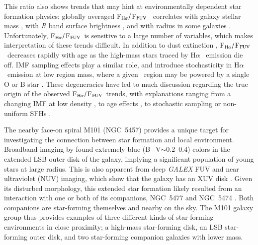 \documentclass[iop]{emulateapj}
\newcommand{\ha}{H$\alpha$}
\newcommand{\bmv}{B$-$V}
\newcommand{\hafuv}{F$_{\rm H\alpha}/$F$_{\rm FUV}$}
\begin{document}
This ratio also shows trends that may hint at environmentally
dependent star formation physics: globally averaged \hafuv
\ correlates with galaxy stellar mass \citep{boselli09, lee09}, with
\emph{R} band surface brightness \citep[but see Weisz et
  al. 2012]{meurer09}, and with radius in some galaxies
\citep{thilker05, goddard10, hunter10}.  Unfortunately, \hafuv \ is
sensitive to a large number of variables, which makes interpretation
of these trends difficult.  In addition to dust extinction \citep[in
  fact, \hafuv \ correlates extremely well with extinction, to the
  point that it can itself be used as an extinction
  estimator;][]{cortese06, koyama15}, \hafuv \ decreases rapidly with
age \citep[e.g.][]{leroy12} as the high-mass stars traced by \ha
\ emission die off.  IMF sampling effects play a similar role, and
introduce stochasticity in \ha \ emission at low  region
mass, where a given  \ region may be powered by a single O
or B star \citep{lee09, lee11}.  These degeneracies have led to much
discussion regarding the true origin of the observed \hafuv \ trends,
with explanations ranging from a changing IMF at low density
  \citep{pflamm08, meurer09, pflamm09}, to age effects
\citep{alberts11}, to stochastic sampling \citep{goddard10,
  hermanowicz13} or non-uniform SFHs \citep{weisz12}.

The nearby face-on spiral M101 (NGC~5457) provides a unique target for
investigating the connection between star formation and
local environment.  Broadband imaging by \citet{mihos13} found
extremely blue (\bmv$\sim$0.2--0.4) colors in the extended LSB outer
disk of the galaxy, implying a significant population of young stars
at large radius.  This is also apparent from deep \emph{GALEX} FUV and
near ultraviolet (NUV) imaging, which show that the galaxy has an XUV
disk \citep{thilker07}.  Given its disturbed morphology, this
extended star formation likely resulted from an interaction with one
or both of its companions, NGC~5477 and NGC~5474 \citep{mihos13}.
Both companions are star-forming themselves and nearby on the sky.
The M101 galaxy group thus provides examples of three different kinds
of star-forming environments in close proximity; a high-mass
star-forming disk, an LSB star-forming outer disk, and two
star-forming companion galaxies with lower mass.
\end{document}

